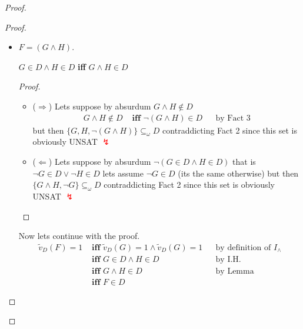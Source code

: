 \begin{proof}
\begin{proof}
\begin{itemize}
				\item $F = (G \wedge H)$.
				  \begin{lemma*} $G \in D \wedge H \in D$ \textbf{ iff } $G \wedge H \in D$ \end{lemma*}
				  \begin{proof} \hspace{2cm}
					\begin{itemize}
					  \item ($\Rightarrow$) Lets suppose by absurdum $G \wedge H \notin D$
						\begin{align*}
						  G \wedge H \notin D &\textbf{ iff } \neg(G \wedge H) \in D && \text{by Fact 3}
						\end{align*}
						but then $\{G, H, \neg(G \wedge H)\} \subseteq_\omega D$ contraddicting Fact 2 since this set is obviously UNSAT \textcolor{red}{$\lightning$}
						\item ($\Leftarrow$) Lets suppose by absurdum $\neg(G \in D \wedge H \in D)$ that is $ \neg G \in D \vee \neg H \in D$ lets assume $\neg G \in D$ (its the same otherwise)  but then $\{G \wedge H, \neg G\} \subseteq_\omega D$ contraddicting Fact 2 since this set is obviously UNSAT \textcolor{red}{$\lightning$}
					\end{itemize}
				\end{proof}
				\vspace{-0.5cm}
				Now lets continue with the proof.
				\begin{align*}
				  \tilde{v}_D (F) = 1 &\textbf{ iff } \tilde{v}_D (G) = 1 \wedge \tilde{v}_D (G) = 1  && \text{by definition of $I_\wedge$} \\
				  &\textbf{ iff } G \in D \wedge H \in D  && \text{by I.H.} \\
				  &\textbf{ iff } G \wedge H \in D && \text{by Lemma} \\
				  &\textbf{ iff } F \in D &&
				\end{align*}


\end{itemize}
\end{proof}
\end{proof}

